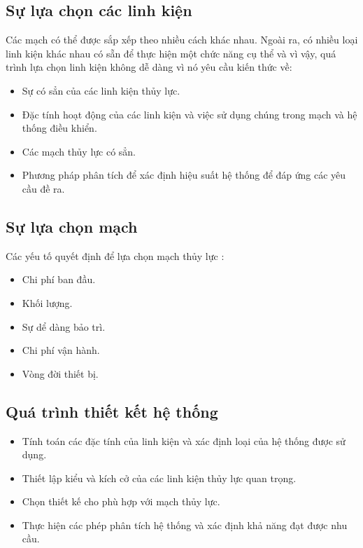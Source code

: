 \documentclass[THUY_LUC_KHI_NEN.tex]{subfiles}
\begin{document}
\subsection{Sự lựa chọn các linh kiện}
Các mạch có thể được sắp xếp theo nhiều cách khác nhau. Ngoài ra, có nhiều loại linh kiện khác nhau có sẵn để thực hiện một chức năng cụ thể và vì
vậy, quá trình lựa chọn linh kiện không dễ dàng vì nó yêu cầu kiến thức về:
\begin{itemize}
    \item Sự có sẳn của các linh kiện thủy lực.
    \item Đặc tính hoạt động của các linh kiện và việc sử dụng chúng trong mạch và hệ thống điều khiển.
    \item Các mạch thủy lực có sẳn.
    \item Phương pháp phân tích để xác định hiệu suất hệ thống để đáp ứng các yêu cầu đề ra.
\end{itemize}
\subsection{Sự lựa chọn mạch}
Các yếu tố quyết định để lựa chọn mạch thủy lực :
\begin{itemize}
    \item Chi phí ban đầu.
    \item Khối lượng.
    \item Sự dể dàng bảo trì.
    \item Chi phí vận hành.
    \item Vòng đời thiết bị.
\end{itemize}
\subsection{Quá trình thiết kết hệ thống}
\begin{itemize}
    \item Tính toán các đặc tính của linh kiện và xác định loại của hệ thống được sử dụng.
    \item Thiết lập kiểu và kích cở của các linh kiện thủy lực quan trọng.
    \item Chọn thiết kế cho phù hợp với mạch thủy lực.
    \item Thực hiện các phép phân tích hệ thống và xác định khả năng đạt được nhu cầu.
\end{itemize}
\end{document}
